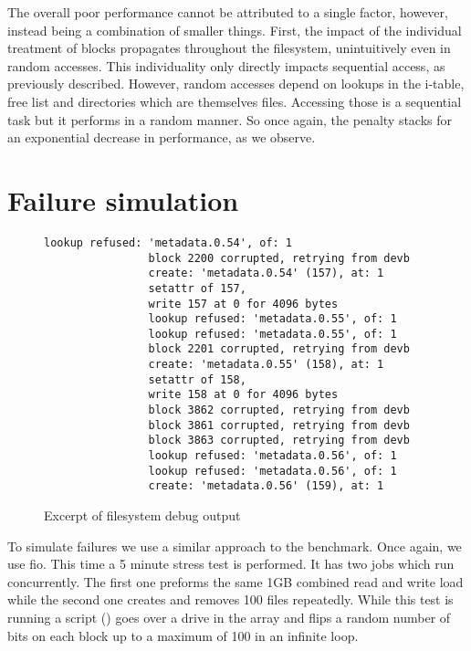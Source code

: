         The overall poor performance cannot be attributed to a single factor,
        however, instead being a combination of smaller things. First, the
        impact of the individual treatment of blocks propagates throughout the
        filesystem, unintuitively even in random accesses. This individuality
        only directly impacts sequential access, as previously described.
        However, random accesses depend on lookups in the i-table, free list
        and directories which are themselves files. Accessing those is a
        sequential task but it performs in a random manner. So once again, the
        penalty stacks for an exponential decrease in performance, as we
        observe.

    \section{Failure simulation}

        \begin{wrapfigure}[17]{r}{0.55\textwidth}
            \vspace{-20pt}
            \begin{lstlisting}[gobble=16]
                lookup refused: 'metadata.0.54', of: 1
                block 2200 corrupted, retrying from devb
                create: 'metadata.0.54' (157), at: 1
                setattr of 157,
                write 157 at 0 for 4096 bytes
                lookup refused: 'metadata.0.55', of: 1
                lookup refused: 'metadata.0.55', of: 1
                block 2201 corrupted, retrying from devb
                create: 'metadata.0.55' (158), at: 1
                setattr of 158,
                write 158 at 0 for 4096 bytes
                block 3862 corrupted, retrying from devb
                block 3861 corrupted, retrying from devb
                block 3863 corrupted, retrying from devb
                lookup refused: 'metadata.0.56', of: 1
                lookup refused: 'metadata.0.56', of: 1
                create: 'metadata.0.56' (159), at: 1
            \end{lstlisting}
            \caption{Excerpt of filesystem debug output}
            \label{fig:corruption}
        \end{wrapfigure}

        To simulate failures we use a similar approach to the benchmark. Once
        again, we use fio. This time a 5 minute stress test is performed. It
        has two jobs which run concurrently. The first one preforms the same
        1GB combined read and write load while the second one creates and
        removes 100 files repeatedly. While this test is running a script
        () goes over a drive in the array
        and flips a random number of bits on each block up to a maximum of 100
        in an infinite loop.

